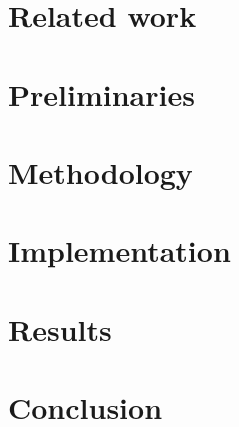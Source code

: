 \documentclass{article}
\theoremstyle{plain}
\theoremstyle{definition}
\theoremstyle{remark}
\begin{document}
\section{Related work}\label{sec:related_work}


\section{Preliminaries}\label{sec:preliminaries}


\section{Methodology}\label{sec:methodology}


\section{Implementation}\label{sec:implementation}


\section{Results}\label{sec:results}


\section{Conclusion}\label{sec:conclusion}








\appendix







\end{document}
